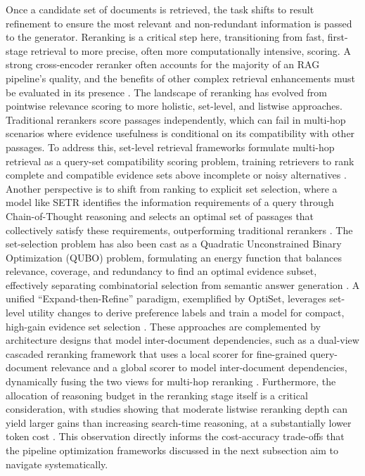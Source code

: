 \documentclass[11pt]{article}
\begin{document}
Once a candidate set of documents is retrieved, the task shifts to result refinement to ensure the most relevant and non-redundant information is passed to the generator. Reranking is a critical step here, transitioning from fast, first-stage retrieval to more precise, often more computationally intensive, scoring. A strong cross-encoder reranker often accounts for the majority of an RAG pipeline's quality, and the benefits of other complex retrieval enhancements must be evaluated in its presence \cite{ref134}. The landscape of reranking has evolved from pointwise relevance scoring to more holistic, set-level, and listwise approaches. Traditional rerankers score passages independently, which can fail in multi-hop scenarios where evidence usefulness is conditional on its compatibility with other passages. To address this, set-level retrieval frameworks formulate multi-hop retrieval as a query-set compatibility scoring problem, training retrievers to rank complete and compatible evidence sets above incomplete or noisy alternatives \cite{ref135}. Another perspective is to shift from ranking to explicit set selection, where a model like SETR identifies the information requirements of a query through Chain-of-Thought reasoning and selects an optimal set of passages that collectively satisfy these requirements, outperforming traditional rerankers \cite{ref136}. The set-selection problem has also been cast as a Quadratic Unconstrained Binary Optimization (QUBO) problem, formulating an energy function that balances relevance, coverage, and redundancy to find an optimal evidence subset, effectively separating combinatorial selection from semantic answer generation \cite{ref137}. A unified ``Expand-then-Refine'' paradigm, exemplified by OptiSet, leverages set-level utility changes to derive preference labels and train a model for compact, high-gain evidence set selection \cite{ref138}. These approaches are complemented by architecture designs that model inter-document dependencies, such as a dual-view cascaded reranking framework that uses a local scorer for fine-grained query-document relevance and a global scorer to model inter-document dependencies, dynamically fusing the two views for multi-hop reranking \cite{ref139}. Furthermore, the allocation of reasoning budget in the reranking stage itself is a critical consideration, with studies showing that moderate listwise reranking depth can yield larger gains than increasing search-time reasoning, at a substantially lower token cost \cite{ref140}. This observation directly informs the cost-accuracy trade-offs that the pipeline optimization frameworks discussed in the next subsection aim to navigate systematically.
\end{document}
